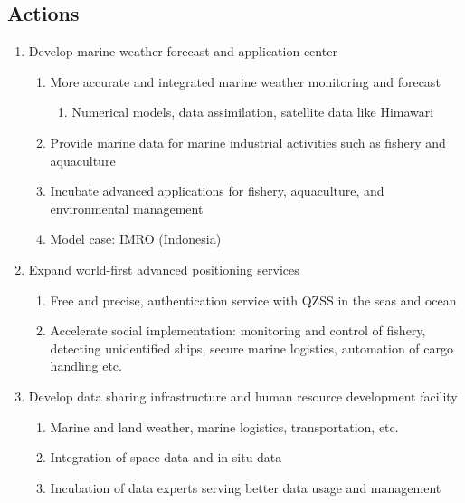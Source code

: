 \subsection{Actions}

\begin{enumerate}

\item Develop marine weather forecast and application center

	\begin{enumerate}
	\item More accurate and integrated marine weather monitoring and forecast

		\begin{enumerate}
		\item Numerical models, data assimilation, satellite data like Himawari
		\end{enumerate}
	
	\item Provide marine data for marine industrial activities such as fishery and aquaculture
	\item Incubate advanced applications for fishery, aquaculture, and environmental management
	\item Model case: IMRO (Indonesia)
	\end{enumerate}

\item Expand world-first advanced positioning services

	\begin{enumerate}
	\item Free and precise, authentication service with QZSS in the seas and ocean
	\item Accelerate social implementation: monitoring and control of fishery, detecting unidentified ships, secure marine logistics, automation of cargo handling etc.
	\end{enumerate}

\item Develop data sharing infrastructure and human resource development facility

	\begin{enumerate}
	\item Marine and land weather, marine logistics, transportation, etc.
	\item Integration of space data and in-situ data
	\item Incubation of data experts serving better data usage and management
	\end{enumerate}

\end{enumerate}



